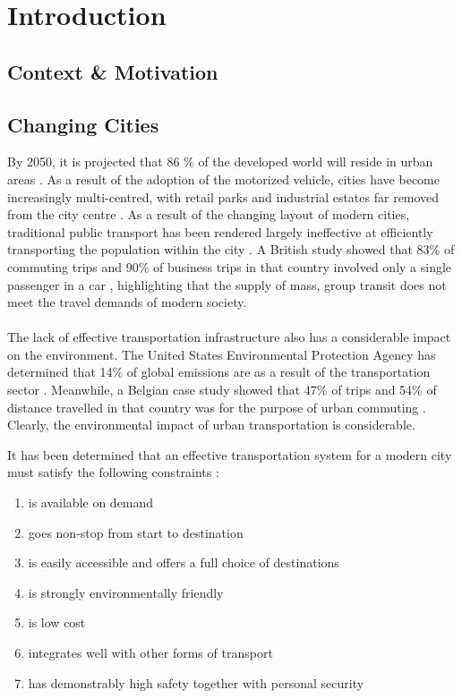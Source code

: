 \section{Introduction}
\subsection{Context \& Motivation}
\subsection{Changing Cities}

By 2050, it is projected that 86 \% of the developed world will reside in urban areas \cite{Economist}. 
As a result of the adoption of the motorized vehicle, cities have become increasingly multi-centred, with retail parks and industrial estates far removed from the city centre \cite{SustainableTransport}. 
As a result of the changing layout of modern cities, traditional public transport has been rendered largely ineffective at efficiently transporting the population within the city \cite{SustainableTransport}. 
A British study showed that 83\% of commuting trips and 90\% of business trips in that country involved only a single passenger in a car \cite{NTS}, highlighting that the supply of mass, group transit does not meet the travel demands of modern society.
\\
\\
The lack of effective transportation infrastructure also has a considerable impact on the environment. 
The United States Environmental Protection Agency has determined that 14\% of global emissions are as a result of the transportation sector \cite{EPA}. 
Meanwhile, a Belgian case study showed that 47\% of trips and 54\% of distance travelled in that country was for the purpose of urban commuting \cite{Belgium}. 
Clearly, the environmental impact of urban transportation is considerable.

It has been determined that an effective transportation system for a modern city must satisfy the following constraints \cite{SustainableTransport}:

\begin{enumerate}
	\item is available on demand
	\item goes non-stop from start to destination
	\item is easily accessible and offers a full choice of destinations
	\item is strongly environmentally friendly
	\item is low cost
	\item integrates well with other forms of transport
	\item has demonstrably high safety together with personal security
\end{enumerate}

